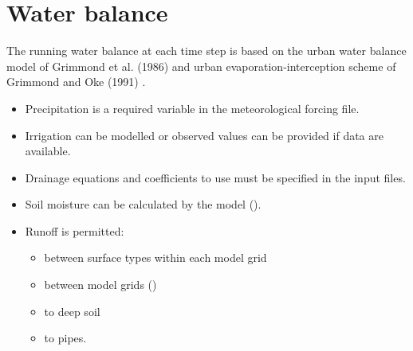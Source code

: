 \documentclass[letterpaper,10pt,english]{sphinxmanual}
\begin{document}
\section{Water balance}
\label{\detokenize{parameterisations-and-sub-models:water-balance}}
The running water balance at each time step is based on the urban water
balance model of Grimmond et al. (1986) \label{\detokenize{parameterisations-and-sub-models:id16}}{\hyperref[\detokenize{references:g86}]{\sphinxcrossref{{[}G86{]}}}} and urban
evaporation-interception scheme of Grimmond and Oke (1991) \label{\detokenize{parameterisations-and-sub-models:id17}}{\hyperref[\detokenize{references:g91}]{\sphinxcrossref{{[}G91{]}}}}.
\begin{itemize}
\item {} 
Precipitation is a required variable in the meteorological forcing
file.

\item {} 
Irrigation can be modelled \label{\detokenize{parameterisations-and-sub-models:id18}}{\hyperref[\detokenize{references:j11}]{\sphinxcrossref{{[}J11{]}}}} or observed values can be provided
if data are available.

\item {} 
Drainage equations and coefficients to use must be specified in the
input files.

\item {} 
Soil moisture can be calculated by the model ().

\item {} 
Runoff is permitted:
\begin{itemize}
\item {} 
between surface types within each model grid

\item {} 
between model grids ()

\item {} 
to deep soil

\item {} 
to pipes.

\end{itemize}

\end{itemize}
\end{document}

